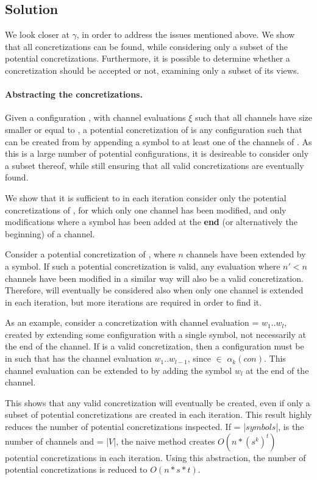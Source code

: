 \subsection{Solution}
We look closer at $\gamma$, in order to address the issues mentioned above. We show that all concretizations can be found, while considering only a subset of the potential concretizations. Furthermore, it is possible to determine whether a concretization should be accepted or not, examining only a subset of its views. 

\paragraph{Abstracting the concretizations.}
Given a configuration , with channel evaluations $\xi$ such that all channels have size smaller or equal to , a potential concretization of  is any configuration  such that  can be created from  by appending a symbol to at least one of the channels of . As this is a large number of potential configurations, it is desireable to consider only a subset thereof, while still ensuring that all valid concretizations are eventually found.

We show that it is sufficient to in each iteration consider only the potential concretizations of , for which only one channel has been modified, and only modifications where a symbol has been added at the \textbf{end} (or alternatively the beginning) of a channel.

Consider a potential concretization  of , where $n$ channels have been extended by a symbol. If such a potential concretization is valid, any evaluation where $n'<n$ channels have been modified in a similar way will also be a valid concretization. Therefore,  will eventually be considered also when only one channel is extended in each iteration, but more iterations are required in order to find it.

As an example, consider a concretization with channel evaluation  = $w_1..w_l$, created by extending some configuration with a single symbol, not necessarily at the end of the channel. If  is a valid concretization, then a configuration  must be in  such that  has the channel evaluation $w_1..w_{l-1}$, since  $\in$ $\alpha_k(con)$. This channel evaluation can be extended to  by adding the symbol $w_l$ at the end of the channel.

This shows that any valid concretization will eventually be created, even if only a subset of potential concretizations are created in each iteration. This result highly reduces the number of potential concretizations inspected. If  = |$symbols$|,  is the number of channels and  = |$V$|, the naive method creates $O(n*(s^k)^t)$ potential concretizations in each iteration. Using this abstraction, the number of potential concretizations is reduced to $O(n*s*t)$.

